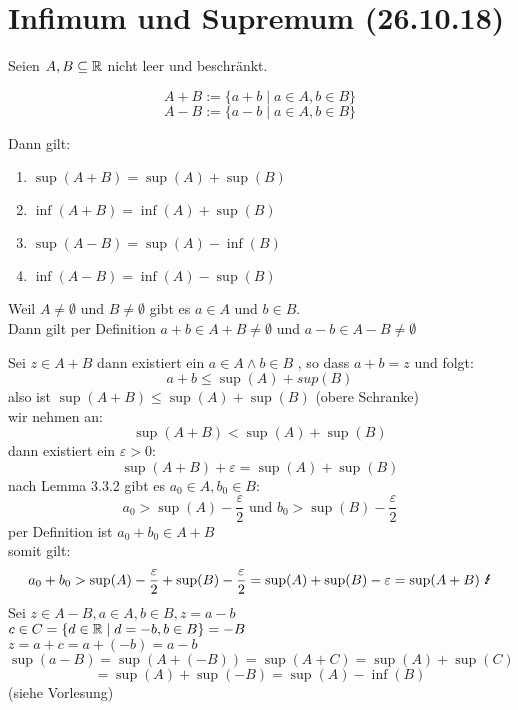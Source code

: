 \documentclass[../ana1u.tex]{subfiles}
\begin{document}
\setcounter{section}{1}

\section{Infimum und Supremum (26.10.18)}
\begin{satz}
    Seien \(A, B \subseteq \mathbb{R}\) nicht leer und beschränkt.
    \begin{defi}
        \[A + B := \{a + b \; | \; a \in A, b \in B\}\]
        \[A - B := \{a - b \; | \; a \in A, b \in B\}\]
    \end{defi}
    Dann gilt:
    \begin{enumerate}
        \item \(\sup(A + B) = \sup(A) + \sup(B)\)
        \item \(\inf(A + B) = \inf(A) + \sup(B)\)
        \item \(\sup(A - B) = \sup(A) - \inf(B)\)
        \item \(\inf(A - B) = \inf(A) - \sup(B)\)
    \end{enumerate}
    Weil \(A \neq \emptyset\) und \(B \neq \emptyset\) gibt es \(a \in A\) und \(b \in B\).\\
    Dann gilt per Definition \(a+b \in A+B \neq \emptyset\) und \(a-b \in A-B \neq \emptyset\)
\end{satz}
\begin{bew}
    Sei \(z \in A + B\) dann existiert ein \(a \in A \wedge b \in B\) , so dass \(a + b = z\) 
    und folgt:
    \[a + b \leq \sup(A) + sup(B)\]	
    also ist \(\sup(A+B) \leq \sup(A) + \sup(B)\) (obere Schranke)\\
    wir nehmen an:
    \[\sup(A+B) < \sup(A) + \sup(B)\]
    dann existiert ein \(\varepsilon > 0\):
    \[\sup(A+B) + \varepsilon = \sup(A) + \sup(B)\]
    nach Lemma 3.3.2 gibt es \(a_0 \in A, b_0 \in B\):
    \[a_0 > \sup(A) - \frac{\varepsilon}{2} \text{ und } b_0 > \sup(B) 
    - \frac{\varepsilon}{2}\]
    per Definition ist \(a_0 + b_0 \in A + B\)\\
    somit gilt:
    \[a_0 + b_0 > \sup(A) - \frac{\varepsilon}{2} + \sup(B) - \frac{\varepsilon}{2} 
    = \sup(A) + \sup(B) - \varepsilon = \sup(A+B) \text{ \Lightning}\]
    Sei \(z \in A - B, a \in A, b \in B, z = a - b\)\\
    \(c \in C = \{d \in \mathbb{R} \; | \; d = -b, b \in B\} = -B\)\\
    \(z = a + c = a + (-b) = a - b\) 
    \[\sup(a-B) = \sup(A + (-B)) = \sup(A + C) = \sup(A) + \sup(C)\]
    \[= \sup(A) + \sup(-B) = \sup(A) - \inf(B)\] (siehe Vorlesung)
\end{bew}
\end{document}

